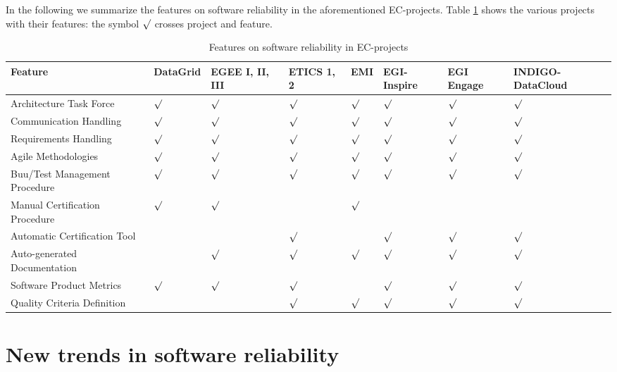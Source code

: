 \documentclass[journal]{IEEEtran}
\begin{document}
In the following we summarize the features on software reliability in the aforementioned EC-projects.
Table \ref{tab:feat} shows the various projects 
with their features: the symbol $\surd$ crosses project and feature.

\begin{table}[!h]
\renewcommand{\arraystretch}{1.3}
\caption{Features on software reliability in EC-projects}
\label{tab:feat}
\centering
\begin{tabular}{llllllll}
\hline
\hline
Feature & DataGrid & EGEE I, II, III & ETICS 1, 2 & EMI & EGI-Inspire & EGI Engage & INDIGO-DataCloud\\
\hline
\hline
Architecture Task Force&$\surd$&$\surd$&$\surd$&$\surd$&$\surd$&$\surd$&$\surd$\\
Communication Handling&$\surd$&$\surd$&$\surd$&$\surd$&$\surd$&$\surd$&$\surd$\\
Requirements Handling&$\surd$&$\surd$&$\surd$&$\surd$&$\surd$&$\surd$&$\surd$\\
Agile Methodologies&$\surd$&$\surd$&$\surd$&$\surd$&$\surd$&$\surd$&$\surd$\\
Buu/Test Management Procedure&$\surd$&$\surd$&$\surd$&$\surd$&$\surd$&$\surd$&$\surd$\\
Manual Certification Procedure&$\surd$&$\surd$&&$\surd$&&&\\
Automatic Certification Tool&&&$\surd$&&$\surd$&$\surd$&$\surd$\\
Auto-generated Documentation&&$\surd$&$\surd$&$\surd$&$\surd$&$\surd$&$\surd$\\
Software Product Metrics&$\surd$&$\surd$&$\surd$&&$\surd$&$\surd$&$\surd$\\
Quality Criteria Definition&&&$\surd$&$\surd$&$\surd$&$\surd$&$\surd$\\
\hline
\hline
\end{tabular}
\end{table}



\section{New trends in software reliability}
\label{sec:ntsr}
\end{document}
